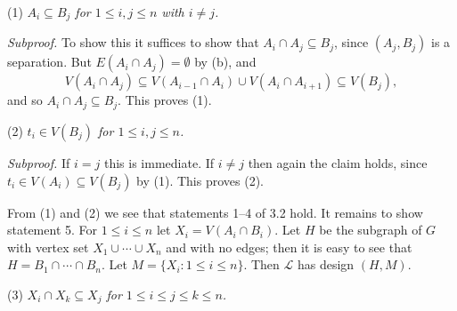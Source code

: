 \hspace*{12pt}(1) \textit{$A_i \subseteq B_j$ for $1 \le i, j \le n$ with $i \ne j$.}

\textit{Subproof.} To show this it suffices to show that $A_i \cap A_j \subseteq B_j$, since $(A_j, B_j)$ is a separation. But $E(A_i \cap A_j) = \emptyset$ by (b), and
\begin{equation*}
V(A_i \cap A_j) \subseteq V(A_{i-1} \cap A_i) \cup V(A_i \cap A_{i+1}) \subseteq V(B_j),
\end{equation*}
and so $A_i \cap A_j \subseteq B_j$. This proves (1).

\hspace*{12pt}(2) \textit{$t_i \in V(B_j)$ for $1 \le i, j \le n$.}

\textit{Subproof.} If $i = j$ this is immediate. If $i \ne j$ then again the claim holds, since $t_i \in V(A_i) \subseteq V(B_j)$ by (1). This proves (2).

From (1) and (2) we see that statements 1--4 of 3.2 hold. It remains to show statement 5. For $1 \le i \le n$ let $X_i = V(A_i \cap B_i)$. Let $H$ be the subgraph of $G$ with vertex set $X_1 \cup \cdots \cup X_n$ and with no edges; then it is easy to see that $H = B_1 \cap \cdots \cap B_n$. Let $M = \{X_i \colon 1 \le i \le n\}$. Then $\mathscr{L}$ has design $(H, M)$.

\hspace*{12pt}(3) \textit{$X_i \cap X_k \subseteq X_j$ for $1 \le i \le j \le k \le n$.}
